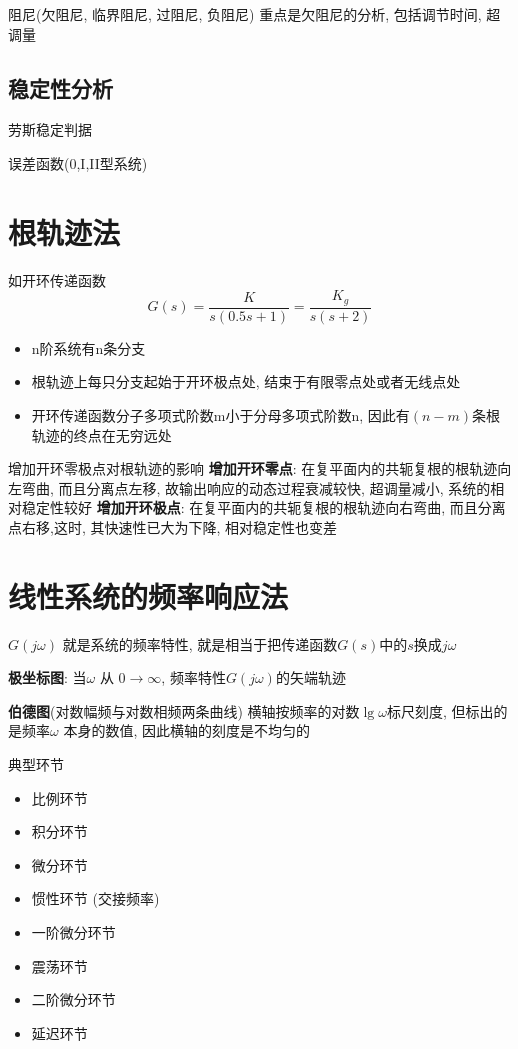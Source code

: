 \documentclass[openany]{book}
\begin{document}
阻尼(欠阻尼, 临界阻尼, 过阻尼, 负阻尼)
\newline 重点是欠阻尼的分析, 包括调节时间, 超调量

\subsection{稳定性分析}
劳斯稳定判据

误差函数(0,I,II型系统)

\section{根轨迹法}
如开环传递函数
$$
G(s) = \frac{ K}{s(0.5s+1)} = \frac{K_g}{s(s+2)}
$$
\begin{itemize}
	\item n阶系统有n条分支
	\item 根轨迹上每只分支起始于开环极点处, 结束于有限零点处或者无线点处
	\item 开环传递函数分子多项式阶数m小于分母多项式阶数n, 因此有$(n-m)$条根轨迹的终点在无穷远处
\end{itemize}

增加开环零极点对根轨迹的影响\newline
\textbf{增加开环零点}: 在复平面内的共轭复根的根轨迹向左弯曲, 而且分离点左移, 故输出响应的动态过程衰减较快, 超调量减小, 系统的相对稳定性较好\newline
\textbf{增加开环极点}: 在复平面内的共轭复根的根轨迹向右弯曲, 而且分离点右移,这时, 其快速性已大为下降, 相对稳定性也变差

\section{线性系统的频率响应法}
$G(j\omega)$ 就是系统的频率特性, 就是相当于把传递函数$G(s)$中的$s$换成$j\omega$

\textbf{极坐标图}: 当$\omega$ 从 $0 \to \infty$, 频率特性$G(j\omega)$的矢端轨迹

\textbf{伯德图}(对数幅频与对数相频两条曲线)\newline
横轴按频率的对数$\lg \omega$标尺刻度, 但标出的是频率$\omega$ 本身的数值, 因此横轴的刻度是不均匀的

典型环节
\begin{itemize}
  \item 比例环节
  \item 积分环节
  \item 微分环节
  \item 惯性环节 (交接频率)
  \item 一阶微分环节
  \item 震荡环节
  \item 二阶微分环节
  \item 延迟环节
\end{itemize}
\end{document}

